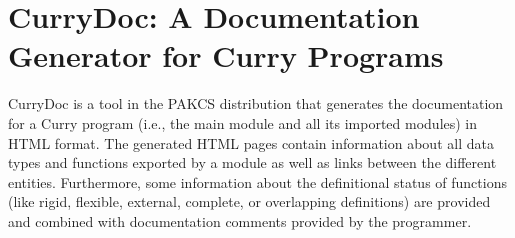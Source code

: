 \section{CurryDoc: A Documentation Generator for Curry Programs}

CurryDoc
is a tool in the PAKCS distribution that generates
the documentation for a Curry program (i.e., the main module
and all its imported modules) in HTML format.
The generated HTML pages contain information about
all data types and functions exported by a module as well
as links between the different entities.
Furthermore, some information about the definitional status
of functions (like rigid, flexible, external, complete, or
overlapping definitions) are provided and combined with
documentation comments provided by the programmer.

